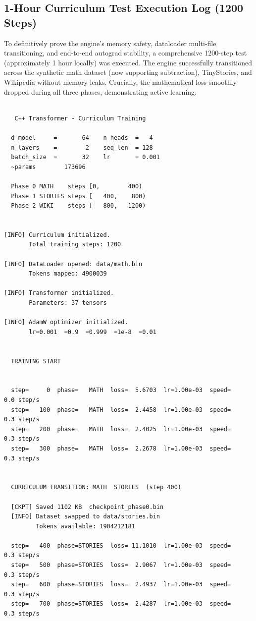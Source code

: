 \documentclass[12pt, a4paper]{article}
\begin{document}
\subsection{1-Hour Curriculum Test Execution Log (1200 Steps)}

To definitively prove the engine's memory safety, dataloader multi-file transitioning, and end-to-end autograd stability, a comprehensive 1200-step test (approximately 1 hour locally) was executed. The engine successfully transitioned across the synthetic math dataset (now supporting subtraction), TinyStories, and Wikipedia without memory leaks. Crucially, the mathematical loss smoothly dropped during all three phases, demonstrating active learning.

\begin{verbatim}

   C++ Transformer - Curriculum Training      

  d_model     =       64    n_heads  =   4 
  n_layers    =        2    seq_len  = 128 
  batch_size  =       32    lr       = 0.001 
  ~params        173696                 

  Phase 0 MATH    steps [0,        400)      
  Phase 1 STORIES steps [   400,    800)      
  Phase 2 WIKI    steps [   800,   1200)      


[INFO] Curriculum initialized.
       Total training steps: 1200

[INFO] DataLoader opened: data/math.bin
       Tokens mapped: 4900039

[INFO] Transformer initialized.
       Parameters: 37 tensors

[INFO] AdamW optimizer initialized.
       lr=0.001  =0.9  =0.999  =1e-8  =0.01


  TRAINING START


  step=     0  phase=   MATH  loss=  5.6703  lr=1.00e-03  speed=    0.0 step/s
  step=   100  phase=   MATH  loss=  2.4458  lr=1.00e-03  speed=    0.3 step/s
  step=   200  phase=   MATH  loss=  2.4025  lr=1.00e-03  speed=    0.3 step/s
  step=   300  phase=   MATH  loss=  2.2678  lr=1.00e-03  speed=    0.3 step/s


  CURRICULUM TRANSITION: MATH  STORIES  (step 400)

  [CKPT] Saved 1102 KB  checkpoint_phase0.bin
  [INFO] Dataset swapped to data/stories.bin
         Tokens available: 1904212181

  step=   400  phase=STORIES  loss= 11.1010  lr=1.00e-03  speed=    0.3 step/s
  step=   500  phase=STORIES  loss=  2.9067  lr=1.00e-03  speed=    0.3 step/s
  step=   600  phase=STORIES  loss=  2.4937  lr=1.00e-03  speed=    0.3 step/s
  step=   700  phase=STORIES  loss=  2.4287  lr=1.00e-03  speed=    0.3 step/s



\end{verbatim}
\end{document}
